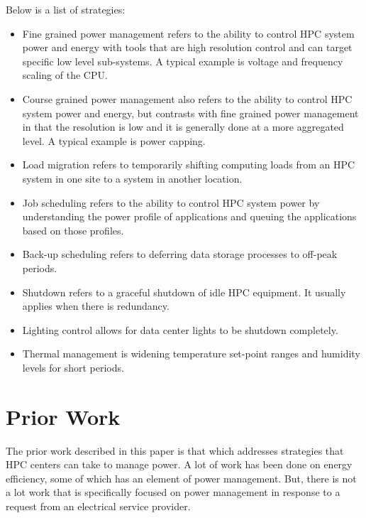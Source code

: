 \documentclass{llncs}
\begin{document}
Below is a list of strategies:

\begin{itemize}
\item Fine grained power management refers to the ability to control HPC system power 
and energy with tools that are high resolution control and can target specific 
low level sub-systems. A typical example is voltage and frequency scaling of the CPU.

\item Course grained power management also refers to the ability to control HPC 
system power and energy, but contrasts with fine grained power management in 
that the resolution is low and it is generally done at a more aggregated level. 
A typical example is power capping.

\item Load migration refers to temporarily shifting computing loads from 
an HPC system in one site to a system in another location.

\item Job scheduling refers to the ability to control HPC system power 
by understanding the power profile of applications and queuing the 
applications based on those profiles.

\item Back-up scheduling refers to deferring data storage processes to off-peak periods.

\item Shutdown refers to a graceful shutdown of idle HPC equipment. It usually 
applies when there is redundancy.

\item Lighting control allows for data center lights to be shutdown completely.

\item Thermal management is widening temperature set-point ranges and 
humidity levels for short periods.
\end{itemize}

\section{Prior Work}

The prior work described in this paper is that which addresses strategies
that HPC centers can take to manage power. A lot of work has been done on
energy efficiency, some of which has an element of power management. But,
there is not a lot work that is specifically focused on power management in
response to a request from an electrical service provider.
\end{document}
